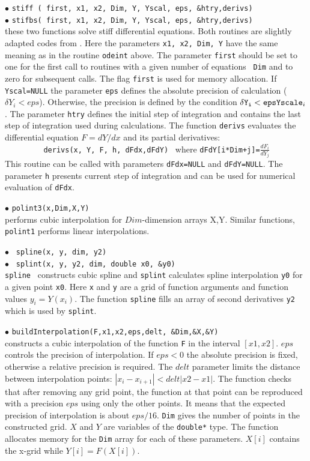 \documentclass[12pt,a4paper]{article}
\begin{document}
\noindent$\bullet$ \verb|stiff ( first, x1, x2, Dim, Y, Yscal, eps, &htry,derivs)|\\
\noindent$\bullet$ \verb|stifbs( first, x1, x2, Dim, Y, Yscal, eps, &htry,derivs)|\\
these two functions solve  stiff  differential
equations. Both routines  are slightly adapted codes from
\cite{Numerical}. Here the parameters  {\tt x1, x2, Dim, Y} have the same
meaning as in the routine  {\tt odeint}  above. The parameter {\tt first}
should be set to one for the first call to routines with a given number of equations {\tt
Dim} and to zero for subsequent calls.  The flag {\tt first} is used for memory allocation.  If {\tt Yscal=NULL}  the parameter
{\tt eps} defines the absolute precision of calculation ($\delta Y_i < eps$).  Otherwise, the
precision is defined by the  condition $\delta {\tt Y_i} < {\tt eps} {\tt Yscale}_i$. 
The parameter {\tt htry} defines the initial step of integration and contains the last step of
integration used during  calculations.
The function {\tt derivs} evaluates the differential equation
$F= dY/dx$  and its partial derivatives:\\  
\verb|         derivs(x, Y, F, h, dFdx,dFdY) | where
\verb|dFdY[i*Dim+j]=|$\frac{dF_i}{dY_j}$\\
This routine can
be called with parameters {\tt dFdx=NULL} and  {\tt dFdY=NULL}. The  parameter
{\tt h} presents current step of integration and can be used for numerical
evaluation of  {\tt dFdx}. 


\noindent$\bullet$ \verb|polint3(x,Dim,X,Y)|\\
performs   cubic interpolation for $Dim$-dimension arrays X,Y. Similar 
functions, \verb|polint1|  performs linear interpolations.

\noindent$\bullet$ \verb| spline(x, y, dim, y2)|\\
\noindent$\bullet$ \verb| splint(x, y, y2, dim, double x0, &y0)|\\
{\tt spline } constructs cubic  spline and {\tt splint} calculates spline
interpolation \verb|y0|  for a given point \verb|x0|. Here  {\tt x} and {\tt y} are a 
grid of function arguments and function values $y_i= Y(x_i)$. The 
function {\tt spline} fills   an array of second  derivatives {\tt y2} which is 
used by  {\tt splint}.
   

\noindent$\bullet$ \verb|buildInterpolation(F,x1,x2,eps,delt, &Dim,&X,&Y)|\\
constructs  a cubic interpolation of the function \verb|F| in the interval $[x1,x2]$.
$eps$ controls the precision of interpolation. If $eps < 0$ the absolute 
precision is fixed, otherwise a relative precision is required.
The $delt$ parameter limits the  distance between  interpolation points: $|x_i
-x_{i+1}|<delt|x2-x1|$.  
The function checks that after removing any grid point, the function at that point
can be reproduced with a precision $eps$ using only the other points.  It means that
the expected precision of interpolation is about $eps/16$. \verb|Dim| gives the number 
of points in the  constructed grid. $X$ and $Y$ are variables of the  
\verb|double*| type. The function allocates memory for the  \verb|Dim| array for each 
 of these parameters. $X[i]$ contains the x-grid while $Y[i]=F(X[i])$.
\end{document}
